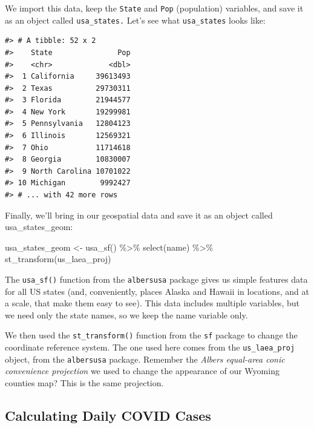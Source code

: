 \documentclass[
]{book}
\newenvironment{Shaded}{\begin{snugshade}}{\end{snugshade}}
\newcommand{\FunctionTok}[1]{\textcolor[rgb]{0.00,0.00,0.00}{#1}}
\newcommand{\NormalTok}[1]{#1}
\newcommand{\OtherTok}[1]{\textcolor[rgb]{0.56,0.35,0.01}{#1}}
\newcommand{\SpecialCharTok}[1]{\textcolor[rgb]{0.00,0.00,0.00}{#1}}
\begin{document}
We import this data, keep the \texttt{State} and \texttt{Pop} (population) variables, and save it as an object called \texttt{usa\_states.} Let's see what \texttt{usa\_states} looks like:

\begin{verbatim}
#> # A tibble: 52 x 2
#>    State               Pop
#>    <chr>             <dbl>
#>  1 California     39613493
#>  2 Texas          29730311
#>  3 Florida        21944577
#>  4 New York       19299981
#>  5 Pennsylvania   12804123
#>  6 Illinois       12569321
#>  7 Ohio           11714618
#>  8 Georgia        10830007
#>  9 North Carolina 10701022
#> 10 Michigan        9992427
#> # ... with 42 more rows
\end{verbatim}

Finally, we'll bring in our geospatial data and save it as an object called usa\_states\_geom:

\begin{Shaded}
\begin{Highlighting}[]
\NormalTok{usa\_states\_geom }\OtherTok{\textless{}{-}} \FunctionTok{usa\_sf}\NormalTok{() }\SpecialCharTok{\%\textgreater{}\%}
  \FunctionTok{select}\NormalTok{(name) }\SpecialCharTok{\%\textgreater{}\%}
  \FunctionTok{st\_transform}\NormalTok{(us\_laea\_proj)}
\end{Highlighting}
\end{Shaded}

The \texttt{usa\_sf()} function from the \texttt{albersusa} package gives us simple features data for all US states (and, conveniently, places Alaska and Hawaii in locations, and at a scale, that make them easy to see). This data includes multiple variables, but we need only the state names, so we keep the name variable only.

We then used the \texttt{st\_transform()} function from the \texttt{sf} package to change the coordinate reference system. The one used here comes from the \texttt{us\_laea\_proj} object, from the \texttt{albersusa} package. Remember the \emph{Albers equal-area conic convenience projection} we used to change the appearance of our Wyoming counties map? This is the same projection.

\hypertarget{calculating-daily-covid-cases}{%
\subsection*{Calculating Daily COVID Cases}\label{calculating-daily-covid-cases}}
\end{document}
